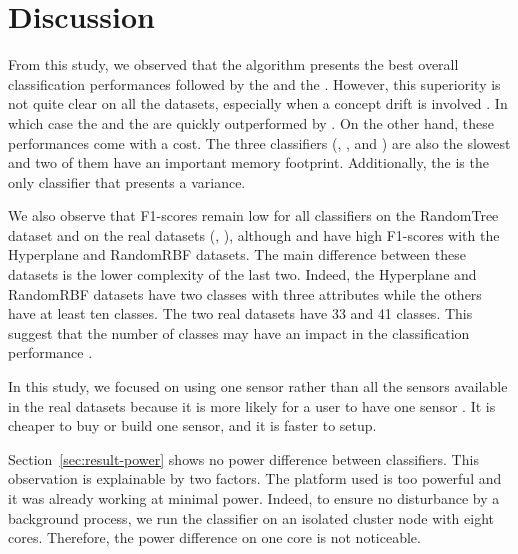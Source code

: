 \section{Discussion}
From this study, we observed that the \hoeffdingtree algorithm presents the
best overall classification performances followed by the \mondrianforest and
the \naivebayes. However, this superiority is not quite clear on all the
datasets, especially when a concept drift is involved . In which case the
\mondrianforest and the \naivebayes are quickly outperformed by \mcnn.  On the
other hand, these performances come with a cost. The three classifiers
(\hoeffdingtree, \mondrianforest, and \naivebayes) are also the slowest and two
of them have an important memory footprint. Additionally, the \mondrianforest
is the only classifier that presents a variance.

We also observe that F1-scores remain low for all classifiers on the
RandomTree dataset and on the real datasets (\banosdataset,
\recofitdataset), although \hoeffdingtree and \mondrianforest have high
F1-scores with the Hyperplane and RandomRBF datasets. The main difference
between these datasets is the lower complexity of the last two. Indeed, the
Hyperplane and RandomRBF datasets have two classes with three attributes
while the others have at least ten classes. The two real datasets have 33
and 41 classes. This suggest that the number of classes may have an impact
in the classification performance .

In this study, we focused on using one sensor rather than all the sensors
available in the real datasets because it is more likely for a user to have one
sensor . It is cheaper to buy or build one sensor, and it is faster to setup.

Section~\ref{sec:result-power} shows no power difference between classifiers. This
observation is explainable by two factors. The platform used is too powerful
and it was already working at minimal power. Indeed, to ensure no disturbance
by a background process, we run the classifier on an isolated cluster node with
eight cores. Therefore, the power difference on one core is not noticeable.

